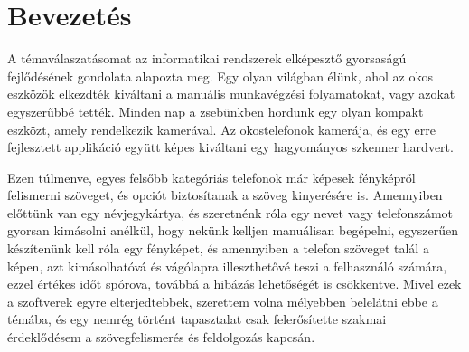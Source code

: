 \documentclass[12pt]{report}
\begin{document}




\tableofcontents

\chapter*{Bevezetés}
A témaválaszatásomat az informatikai rendszerek elképesztő gyorsaságú fejlődésének gondolata alapozta meg. Egy olyan világban élünk, ahol az okos eszközök elkezdték kiváltani a manuális munkavégzési folyamatokat, vagy azokat egyszerűbbé tették. Minden nap a zsebünkben hordunk egy olyan kompakt eszközt, amely rendelkezik kamerával. Az okostelefonok kamerája, és egy erre fejlesztett applikáció együtt képes kiváltani egy hagyományos szkenner hardvert.

Ezen túlmenve, egyes felsőbb kategóriás telefonok már képesek fényképről felismerni szöveget, és opciót biztosítanak a szöveg kinyerésére is. Amennyiben előttünk van egy névjegykártya, és szeretnénk róla egy nevet vagy telefonszámot gyorsan kimásolni anélkül, hogy nekünk kelljen manuálisan begépelni, egyszerűen készítenünk kell róla egy fényképet, és amennyiben a telefon szöveget talál a képen, azt kimásolhatóvá és vágólapra illeszthetővé teszi a felhasználó számára, ezzel értékes időt spórova, továbbá a hibázás lehetőségét is csökkentve.
Mivel ezek a szoftverek egyre elterjedtebbek, szerettem volna mélyebben belelátni ebbe a témába, és egy nemrég történt tapasztalat csak felerősítette szakmai érdeklődésem a szövegfelismerés és feldolgozás kapcsán. 
\end{document}
